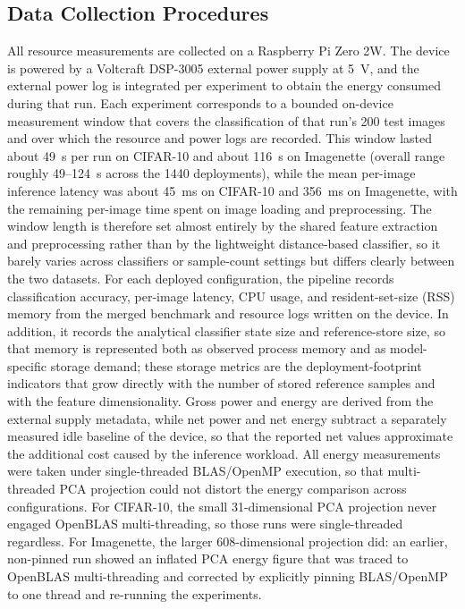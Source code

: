 \documentclass[sigconf,review]{acmart}
\begin{document}
\subsection{Data Collection Procedures}
\label{sec:measurement}
All resource measurements are collected on a Raspberry Pi Zero 2W.
The device is powered by a Voltcraft DSP-3005 external power supply at 5~V, and the external power log is integrated per experiment to obtain the energy consumed during that run.
Each experiment corresponds to a bounded on-device measurement window that covers the classification of that run's 200 test images and over which the resource and power logs are recorded.
This window lasted about 49~s per run on CIFAR-10 and about 116~s on Imagenette (overall range roughly 49--124~s across the 1440 deployments), while the mean per-image inference latency was about 45~ms on CIFAR-10 and 356~ms on Imagenette, with the remaining per-image time spent on image loading and preprocessing.
The window length is therefore set almost entirely by the shared feature extraction and preprocessing rather than by the lightweight distance-based classifier, so it barely varies across classifiers or sample-count settings but differs clearly between the two datasets.
For each deployed configuration, the pipeline records classification accuracy, per-image latency, CPU usage, and resident-set-size (RSS) memory from the merged benchmark and resource logs written on the device.
In addition, it records the analytical classifier state size and reference-store size, so that memory is represented both as observed process memory and as model-specific storage demand; these storage metrics are the deployment-footprint indicators that grow directly with the number of stored reference samples and with the feature dimensionality.
Gross power and energy are derived from the external supply metadata, while net power and net energy subtract a separately measured idle baseline of the device, so that the reported net values approximate the additional cost caused by the inference workload.
All energy measurements were taken under single-threaded BLAS/OpenMP execution, so that multi-threaded PCA projection could not distort the energy comparison across configurations. For CIFAR-10, the small 31-dimensional PCA projection never engaged OpenBLAS multi-threading, so those runs were single-threaded regardless. For Imagenette, the larger 608-dimensional projection did: an earlier, non-pinned run showed an inflated PCA energy figure that was traced to OpenBLAS multi-threading and corrected by explicitly pinning BLAS/OpenMP to one thread and re-running the experiments.
\end{document}
